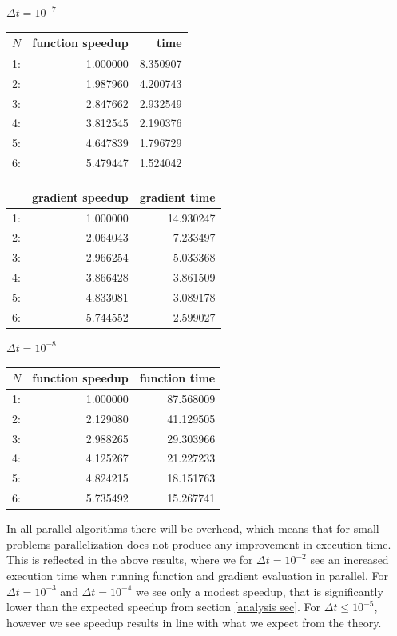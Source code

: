 \begin{center}
$\Delta t=10^{-7}$\\
\begin{tabular}{lrr}
\toprule
{}$N$ &  function speedup &      time \\
\midrule
1: &  1.000000 &  8.350907 \\
2: &  1.987960 &  4.200743 \\
3: &  2.847662 &  2.932549 \\
4: &  3.812545 &  2.190376 \\
5: &  4.647839 &  1.796729 \\
6: &  5.479447 &  1.524042 \\
\bottomrule
\end{tabular}
\begin{tabular}{lrr}
\toprule
{} &  gradient speedup &     gradient  time \\
\midrule
1: &  1.000000 &  14.930247 \\
2: &  2.064043 &   7.233497 \\
3: &  2.966254 &   5.033368 \\
4: &  3.866428 &   3.861509 \\
5: &  4.833081 &   3.089178 \\
6: &  5.744552 &   2.599027 \\
\bottomrule
\end{tabular}
\end{center}
\begin{center}
$\Delta t=10^{-8}$\\
\begin{tabular}{lrr}
\toprule
{} $N$&  function speedup &      function time \\
\midrule
1: &  1.000000 &  87.568009 \\
2: &  2.129080 &  41.129505 \\
3: &  2.988265 &  29.303966 \\
4: &  4.125267 &  21.227233 \\
5: &  4.824215 &  18.151763 \\
6: &  5.735492 &  15.267741 \\
\bottomrule
\end{tabular}
\end{center}
In all parallel algorithms there will be overhead, which means that for small problems parallelization does not produce any improvement in execution time. This is reflected in the above results, where we for $\Delta t = 10^{-2}$ see an increased execution time when running function and gradient evaluation in parallel. For $\Delta t = 10^{-3}$ and $\Delta t = 10^{-4}$ we see only a modest speedup, that is significantly lower than the expected speedup from section \ref{analysis sec}. For $\Delta t \leq 10^{-5}$, however we see speedup results in line with what we expect from the theory.  

